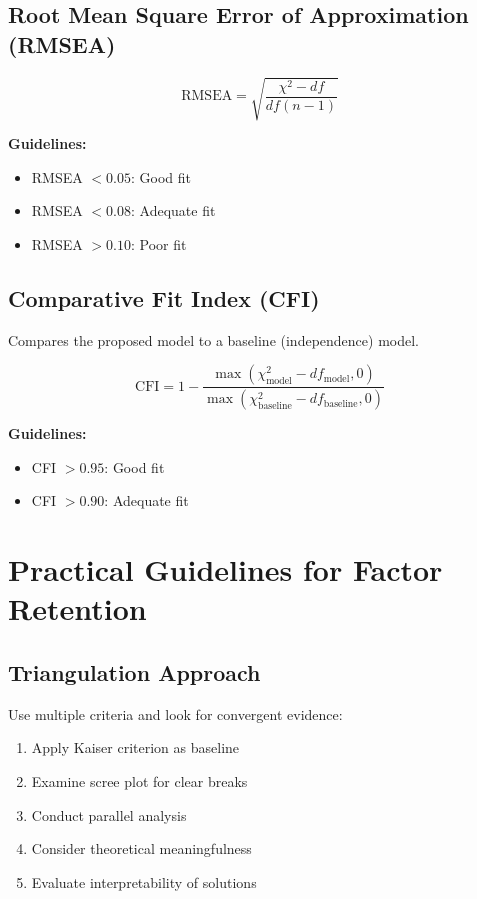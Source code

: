 \documentclass[a4paper]{tufte-book}
\begin{document}
\subsection{Root Mean Square Error of Approximation (RMSEA)}

$$\text{RMSEA} = \sqrt{\frac{\chi^2 - df}{df(n-1)}}$$

\textbf{Guidelines:}
\begin{itemize}
\item RMSEA $< 0.05$: Good fit
\item RMSEA $< 0.08$: Adequate fit
\item RMSEA $> 0.10$: Poor fit
\end{itemize}

\subsection{Comparative Fit Index (CFI)}

Compares the proposed model to a baseline (independence) model.

$$\text{CFI} = 1 - \frac{\max(\chi^2_{\text{model}} - df_{\text{model}}, 0)}{\max(\chi^2_{\text{baseline}} - df_{\text{baseline}}, 0)}$$

\textbf{Guidelines:}
\begin{itemize}
\item CFI $> 0.95$: Good fit
\item CFI $> 0.90$: Adequate fit
\end{itemize}

\section{Practical Guidelines for Factor Retention}

\subsection{Triangulation Approach}

Use multiple criteria and look for convergent evidence:

\begin{enumerate}
\item Apply Kaiser criterion as baseline
\item Examine scree plot for clear breaks
\item Conduct parallel analysis
\item Consider theoretical meaningfulness
\item Evaluate interpretability of solutions
\end{enumerate}
\end{document}
